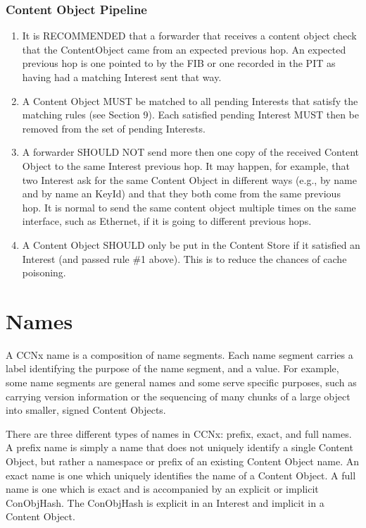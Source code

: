 \documentclass[12pt]{article}
\begin{document}
\subsubsection{Content Object Pipeline}
\begin{enumerate}
\item  It is RECOMMENDED that a forwarder that receives a content object
    check that the ContentObject came from an expected previous hop.
    An expected previous hop is one pointed to by the FIB or one
    recorded in the PIT as having had a matching Interest sent that
    way.

\item  A Content Object MUST be matched to all pending Interests that
    satisfy the matching rules (see Section 9).  Each satisfied
    pending Interest MUST then be removed from the set of pending
    Interests.

\item  A forwarder SHOULD NOT send more then one copy of the received
    Content Object to the same Interest previous hop.  It may happen,
    for example, that two Interest ask for the same Content Object in
    different ways (e.g., by name and by name an KeyId) and that they
    both come from the same previous hop.  It is normal to send the
    same content object multiple times on the same interface, such as
    Ethernet, if it is going to different previous hops.

\item  A Content Object SHOULD only be put in the Content Store if it
    satisfied an Interest (and passed rule \#1 above).  This is to
    reduce the chances of cache poisoning.
\end{enumerate}

\section{Names}
A CCNx name is a composition of name segments.  Each name segment
carries a label identifying the purpose of the name segment, and a
value.  For example, some name segments are general names and some
serve specific purposes, such as carrying version information or the
sequencing of many chunks of a large object into smaller, signed
Content Objects.

There are three different types of names in CCNx: prefix, exact, and
full names.  A prefix name is simply a name that does not uniquely
identify a single Content Object, but rather a namespace or prefix of
an existing Content Object name.  An exact name is one which uniquely
identifies the name of a Content Object.  A full name is one which is
exact and is accompanied by an explicit or implicit ConObjHash.  The
ConObjHash is explicit in an Interest and implicit in a Content
Object.
\end{document}
